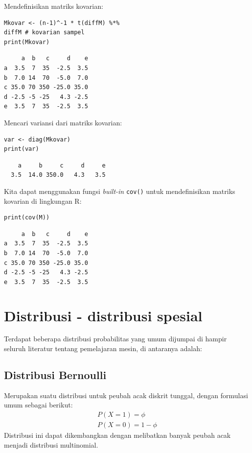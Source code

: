 Mendefinisikan matriks kovarian:
\begin{verbatim}
Mkovar <- (n-1)^-1 * t(diffM) %*% 
diffM # kovarian sampel
print(Mkovar)
\end{verbatim}

\begin{verbatim}
     a  b   c     d    e
a  3.5  7  35  -2.5  3.5
b  7.0 14  70  -5.0  7.0
c 35.0 70 350 -25.0 35.0
d -2.5 -5 -25   4.3 -2.5
e  3.5  7  35  -2.5  3.5
\end{verbatim}

Mencari variansi dari matriks kovarian:
\begin{verbatim}
var <- diag(Mkovar)
print(var)
\end{verbatim}

\begin{verbatim}
    a     b     c     d     e 
  3.5  14.0 350.0   4.3   3.5 
\end{verbatim}

Kita dapat menggunakan fungsi \textit{built-in} \verb|cov()| untuk mendefinisikan matriks kovarian di lingkungan R:

\begin{verbatim}
print(cov(M))
\end{verbatim}

\begin{verbatim}
     a  b   c     d    e
a  3.5  7  35  -2.5  3.5
b  7.0 14  70  -5.0  7.0
c 35.0 70 350 -25.0 35.0
d -2.5 -5 -25   4.3 -2.5
e  3.5  7  35  -2.5  3.5
\end{verbatim}

\section{Distribusi - distribusi spesial}
Terdapat beberapa distribusi probabilitas yang umum dijumpai di hampir seluruh literatur tentang pemelajaran mesin, di antaranya adalah:
\subsection{Distribusi Bernoulli}
Merupakan suatu distribusi untuk peubah acak diskrit tunggal, dengan formulasi umum sebagai berikut:
\begin{equation}
    \begin{aligned}
        P(X=1) = \phi\\
        P(X=0) = 1 - \phi
    \end{aligned}    
\end{equation}
Distribusi ini dapat dikembangkan dengan melibatkan banyak peubah acak menjadi distribusi multinomial.

